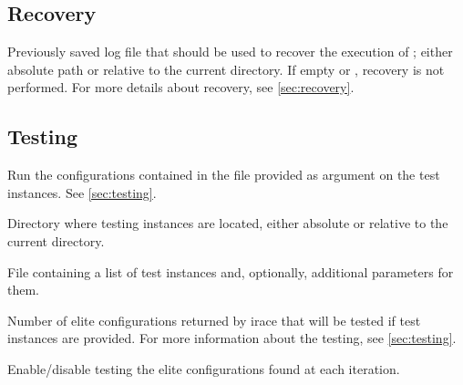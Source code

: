 \subsection[Recovery]{Recovery}
\begin{description}
Previously saved \irace log file that should be used to recover the execution of \irace; either absolute path or relative to the current directory. If empty or , recovery is not performed. 
For more details about recovery, see \autoref{sec:recovery}.

\end{description}

\subsection[Testing]{Testing}
\begin{description}
Run the configurations contained in the file provided as argument on the test instances. See \autoref{sec:testing}.

Directory where testing instances are located, either absolute or relative to the current directory.

File containing a list of test instances and, optionally, additional parameters for them.

  Number of elite configurations returned by irace that will be tested if test instances are provided. For more information about the testing, see \autoref{sec:testing}.

Enable/disable testing the elite configurations found at each iteration.

\end{description}
